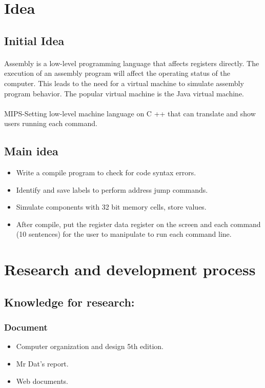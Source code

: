 \documentclass[10pt]{article}
\begin{document}
\begin{large}
\section{Idea}\label{idea}
	\subsection{Initial Idea}
    	\paragraph{} 
    	    Assembly is a low-level programming language that affects registers directly. The execution of an assembly program will affect the operating status of the computer. This leads to the need for a virtual machine to simulate assembly program behavior. The popular virtual machine is the Java virtual machine.
    	\paragraph{}
    	    MIPS-Setting low-level machine language on C ++ that can translate and show users running each command.
	\subsection{Main idea}
        \begin{itemize}
        	\item[]
        	    Write a compile program to check for code syntax errors.
        	\item[]
        	    Identify and save labels to perform address jump commands.
        	\item[]
        	    Simulate components with 32 bit memory cells, store values.
        	\item[]
        	    After compile, put the register data register on the screen and each command (10 sentences) for the user to manipulate to run each command line.
        \end{itemize}
        
\section{Research and development process}\label{R&D}
	\subsection{Knowledge for research:}
    	\subsubsection{Document}
        	\begin{itemize}
            	\item[] Computer organization and design 5th edition.
            	\item[] Mr Dat's report.
            	\item[]Web documents.
    	    \end{itemize}

\end{large}
\end{document}
